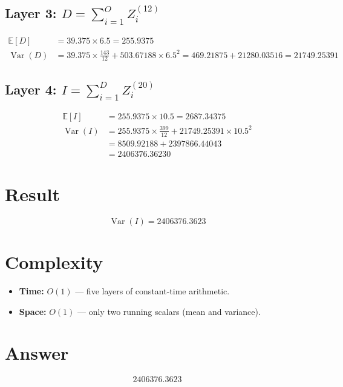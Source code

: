 \documentclass[11pt,a4paper]{article}
\begin{document}
\subsection{Layer 3: $D = \sum_{i=1}^{O} Z_i^{(12)}$}
\begin{align*}
    \mathbb{E}[D] &= 39.375 \times 6.5 = 255.9375 \\
    \operatorname{Var}(D) &= 39.375 \times \frac{143}{12} + 503.67188 \times 6.5^2
        = 469.21875 + 21280.03516 = 21749.25391
\end{align*}

\subsection{Layer 4: $I = \sum_{i=1}^{D} Z_i^{(20)}$}
\begin{align*}
    \mathbb{E}[I] &= 255.9375 \times 10.5 = 2687.34375 \\
    \operatorname{Var}(I) &= 255.9375 \times \frac{399}{12} + 21749.25391 \times 10.5^2 \\
        &= 8509.92188 + 2397866.44043 \\
        &= 2406376.36230
\end{align*}

\section{Result}

\begin{equation}
    \boxed{\operatorname{Var}(I) = 2406376.3623}
\end{equation}

\section{Complexity}

\begin{itemize}
    \item \textbf{Time:} $O(1)$ --- five layers of constant-time arithmetic.
    \item \textbf{Space:} $O(1)$ --- only two running scalars (mean and variance).
\end{itemize}

\section{Answer}

\[
\boxed{2406376.3623}
\]
\end{document}
